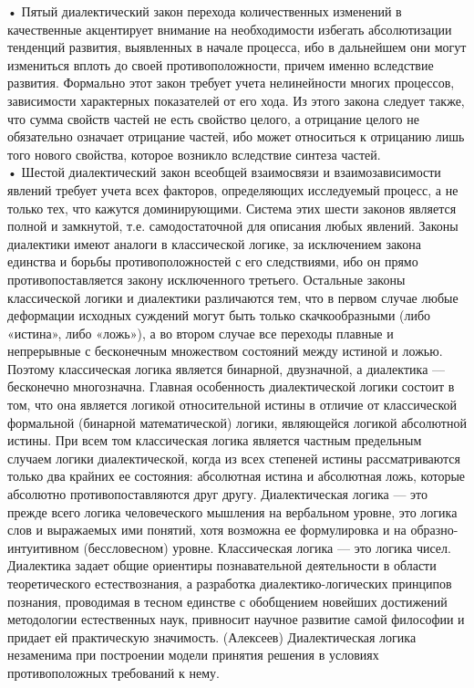 \documentclass[a4paper,12pt]{report}
\begin{document}
    • Пятый диалектический закон перехода количественных изменений в качественные акцентирует внимание на необходимости избегать абсолютизации тенденций развития, выявленных в начале процесса, ибо в дальнейшем они могут измениться вплоть до своей противоположности, причем именно вследствие развития. Формально этот закон требует учета нелинейности многих процессов, зависимости характерных показателей от его хода.
Из этого закона следует также, что сумма свойств частей не есть свойство целого, а отрицание целого не обязательно означает отрицание частей, ибо может относиться к отрицанию лишь того нового свойства, которое возникло вследствие синтеза частей.\\
    • Шестой диалектический закон всеобщей взаимосвязи и взаимозависимости явлений требует учета всех факторов, определяющих исследуемый процесс, а не только тех, что кажутся доминирующими.
Система этих шести законов является полной и замкнутой, т.е. самодостаточной для описания любых явлений. Законы диалектики имеют аналоги в классической логике, за исключением закона единства и борьбы противоположностей с его следствиями, ибо он прямо противопоставляется закону исключенного третьего. Остальные законы классической логики и диалектики различаются тем, что в первом случае любые деформации исходных суждений могут быть только скачкообразными (либо «истина», либо «ложь»), а во втором случае все переходы плавные и непрерывные с бесконечным множеством состояний между истиной и ложью. Поэтому классическая логика является бинарной, двузначной, а диалектика — бесконечно многозначна. Главная особенность диалектической логики состоит в том, что она является логикой относительной истины в отличие от классической формальной (бинарной математической) логики, являющейся логикой абсолютной истины. При всем том классическая логика является частным предельным случаем логики диалектической, когда из всех степеней истины рассматриваются только два крайних ее состояния: абсолютная истина и абсолютная ложь, которые абсолютно противопоставляются друг другу.
	Диалектическая логика — это прежде всего логика человеческого мышления на вербальном уровне, это логика слов и выражаемых ими понятий, хотя возможна ее формулировка и на образно-интуитивном (бессловесном) уровне. Классическая логика — это логика чисел.
	Диалектика задает общие ориентиры познавательной деятельности в области теоретического естествознания, а разработка диалектико-логических принципов познания, проводимая в тесном единстве с обобщением новейших достижений методологии естественных наук, привносит научное развитие самой философии и придает ей практическую значимость. (Алексеев) 
	Диалектическая логика незаменима при построении модели принятия решения в условиях противоположных требований к нему.
\end{document}
